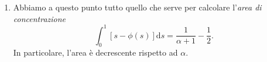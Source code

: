 \begin{soluzione}
\begin{enumerate}
  \item Abbiamo a questo punto tutto quello che serve per calcolare
    l'{\em area di concentrazione}
    \[
      \int_{0}^{1} [s-\phi(s)] \mathrm d s = \frac{1}{\alpha+1} - \frac12 .
    \]
    In particolare, l'area è decrescente rispetto ad \(\alpha\).  \qedhere
  \end{enumerate}
\end{soluzione}

